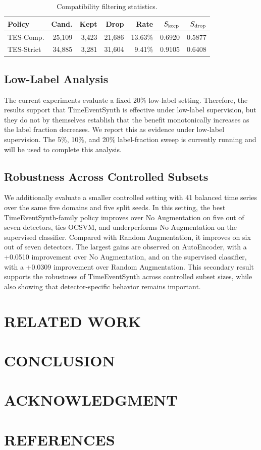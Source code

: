 \documentclass[conference]{IEEEtran}
\begin{document}
\begin{table}[t]
\centering
\caption{Compatibility filtering statistics.}
\label{tab:compatibility_filtering}
\scriptsize
\setlength{\tabcolsep}{3pt}
\begin{tabular}{lrrrrrr}
\toprule
Policy & Cand. & Kept & Drop & Rate & $S_{\rm keep}$ & $S_{\rm drop}$ \\
\midrule
TES-Comp. & 25,109 & 3,423 & 21,686 & 13.63\% & 0.6920 & 0.5877 \\
TES-Strict & 34,885 & 3,281 & 31,604 & 9.41\% & 0.9105 & 0.6408 \\
\bottomrule
\end{tabular}
\end{table}


\subsection{Low-Label Analysis}
\label{sec:low_label_analysis}

The current experiments evaluate a fixed 20\% low-label setting. Therefore, the results support that TimeEventSynth is effective under low-label supervision, but they do not by themselves establish that the benefit monotonically increases as the label fraction decreases. We report this as evidence under low-label supervision. The 5\%, 10\%, and 20\% label-fraction sweep is currently running and will be used to complete this analysis.


\subsection{Robustness Across Controlled Subsets}
\label{sec:controlled_subset_robustness}
We additionally evaluate a smaller controlled setting with 41 balanced time series over the same five domains and five split seeds. In this setting, the best TimeEventSynth-family policy improves over No Augmentation on five out of seven detectors, ties OCSVM, and underperforms No Augmentation on the supervised classifier. Compared with Random Augmentation, it improves on six out of seven detectors. The largest gains are observed on AutoEncoder, with a +0.0510
improvement over No Augmentation, and on the supervised classifier, with a
+0.0309 improvement over Random Augmentation. This secondary result supports the robustness of TimeEventSynth across controlled subset sizes, while also showing that detector-specific behavior remains important.




\section{RELATED WORK}
\section{CONCLUSION}
\section{ACKNOWLEDGMENT}
\section{REFERENCES}
\end{document}
